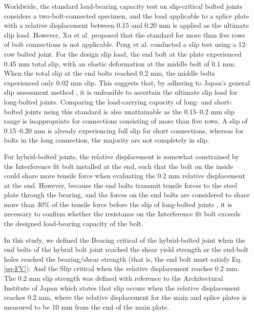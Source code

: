 Worldwide, the standard load-bearing capacity test on slip-critical bolted joints considers a two-bolt-connected specimen, and the load applicable to a splice plate with a relative displacement between 0.15 and 0.20 mm is applied as the ultimate slip load. However, Xu et al.\cite{xu2011} proposed that the standard for more than five rows of bolt connections is not applicable.  Peng et al.\cite{Peng2013FeaDimensions} conducted a slip test using a 12-row bolted joint. For the design slip load, the end bolt at the plate experienced 0.45 mm total slip, with an elastic deformation at the middle bolt of 0.1 mm. When the total slip at the end bolts reached 0.2 mm, the middle bolts experienced only 0.02 mm slip. This suggests that, by adhering to Japan's general slip assessment method \cite{AIJ2012AIJStructures}, it is unfeasible to ascertain the ultimate slip load for long-bolted joints. Comparing the load-carrying capacity of long- and short-bolted joints using this standard is also unattainable as the 0.15--0.2 mm slip range is inappropriate for connections consisting of more than five rows. A slip of 0.15--0.20 mm is already experiencing full slip for short connections, whereas for bolts in the long connection, the majority are not completely in slip. \par

For hybrid-bolted joints, the relative displacement is somewhat constrained by the Interference fit bolt installed at the end, such that the bolt on the inside could share more tensile force when evaluating the 0.2 mm relative displacement at the end. However, because the end bolts transmit tensile forces to the steel plate through the bearing, and the forces on the end bolts are considered to share more than 30\% of the tensile force before the slip of long-bolted joints \cite{Zhanghuazhi2000,chinarailway2005}, it is necessary to confirm whether the resistance on the Interference fit bolt exceeds the designed load-bearing capacity of the bolt. 

In this study, we defined the \ac{Bearing critical} of the hybrid-bolted joint when the end bolts of the hybrid bolt joint reached the shear yield strength or the end-bolt holes reached the bearing/shear strength (that is, the end bolt must satisfy Eq.\ref{eq-FV}). And the \ac{Slip critical} when the relative displacement reaches 0.2 mm. The \ac{0.2 mm slip} strength was defined with reference to the Architectural Institute of Japan \cite{AIJ2012AIJStructures} which states that slip occurs when the relative displacement reaches 0.2 mm, where the relative displacement for the main and splice plates is measured to be 10 mm from the end of the main plate. 

